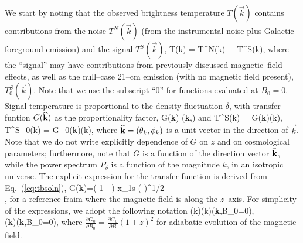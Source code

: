 We start by noting that the observed brightness temperature $T(\vec k)$ contains contributions from the noise $T^N(\vec k)$ (from the instrumental noise plus Galactic foreground emission) and the signal $T^S(\vec k)$, 
\beq
\bga
T(\vec k) = T^N(\vec k) + T^S(\vec k),
\ega
\label{eq:Ttot}
\eeq
where the ``signal'' may have contributions from previously discussed magnetic--field effects, as well as the null--case 21--cm emission (with no magnetic field present), $T^S_0(\vec k)$. Note that we use the subscript ``0'' for functions evaluated at $B_0=0$. Signal temperature is proportional to the density fluctuation $\delta$, with transfer funtion $G({\bf{\widehat k}})$ as the proportionality factor, 
\beq
\bga
G({\bf{\widehat k}}) \equiv {}({\bf{\widehat k}},)
\ega
\eeq
and
\beq
\bga
T^S(\vec k) = G({\bf{\widehat k}})\delta(k),\\
T^S_0(\vec k) = G_0({\bf{\widehat k}})\delta(k),
\ega
\label{eq:def_G}
\eeq
where ${\bf{\widehat k}}=(\theta_k,\phi_k)$ is a unit vector in the direction of $\vec k$. Note that we do not write explicitly dependence of $G$ on $z$ and on cosmological parameters; furthermore, note that $G$ is a function of the direction vector ${\bf{\widehat k}}$, while the power spectrum $P_\delta$ is a function of the magnitude $k$, in an isotropic universe. 
The explicit expression for the transfer function is derived from Eq.~(\ref{eq:tbsoln}),
\beq
\bga
G({\bf{\widehat k}})=\left( 1 -  \right) x_{1{\rm s}} \left(  \right)^{1/2} \\
\times {} ,
\label{eq:G_def}
\ega
\eeq
for a reference fraim where the magnetic field is along the $z$--axis.
For simplicity of the expressions, we adopt the following notation
\beq
\bga
{}(\vec k)\equiv  \delta(k)({\bf{\widehat k}},B_0=0),\\
({\bf{\widehat k}})\equiv{}({\bf{\widehat k}},B_0=0),
\ega
\label{eq:dTdB_dGdB}
\eeq
where $\frac{\partial G_0}{\partial B_0}=\frac{\partial G_0}{\partial B} (1+z)^2$ for adiabatic evolution of the magnetic field. 

